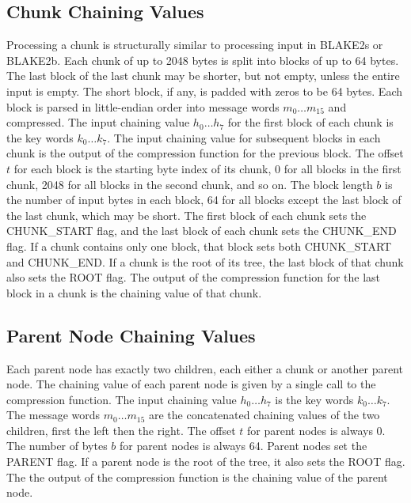\documentclass[11pt,notitlepage,a4paper]{article}
\begin{document}
\subsection{Chunk Chaining Values}\label{sec:chunk}

Processing a chunk is structurally similar to processing input in BLAKE2s or
BLAKE2b. Each chunk of up to 2048 bytes is split into blocks of up to 64 bytes.
The last block of the last chunk may be shorter, but not empty, unless the
entire input is empty. The short block, if any, is padded with zeros to be 64
bytes. Each block is parsed in little-endian order into message words $m_{0}
\ldots m_{15}$ and compressed. The input chaining value $h_{0} \ldots h_{7}$
for the first block of each chunk is the key words $k_{0} \ldots k_{7}$. The
input chaining value for subsequent blocks in each chunk is the output of the
compression function for the previous block. The offset $t$ for each block is
the starting byte index of its chunk, 0 for all blocks in the first chunk, 2048
for all blocks in the second chunk, and so on. The block length $b$ is the
number of input bytes in each block, 64 for all blocks except the last block of
the last chunk, which may be short. The first block of each chunk sets the
CHUNK\_START flag, and the last block of each chunk sets the CHUNK\_END flag.
If a chunk contains only one block, that block sets both CHUNK\_START and
CHUNK\_END. If a chunk is the root of its tree, the last block of that chunk
also sets the ROOT flag. The output of the compression function for the last
block in a chunk is the chaining value of that chunk.

\subsection{Parent Node Chaining Values}\label{sec:parent}

Each parent node has exactly two children, each either a chunk or another
parent node. The chaining value of each parent node is given by a single call
to the compression function. The input chaining value $h_{0} \ldots h_{7}$ is
the key words $k_{0} \ldots k_{7}$. The message words $m_{0} \ldots m_{15}$ are
the concatenated chaining values of the two children, first the left then the
right. The offset $t$ for parent nodes is always 0. The number of bytes $b$ for
parent nodes is always 64. Parent nodes set the PARENT flag. If a parent node
is the root of the tree, it also sets the ROOT flag. The the output of the
compression function is the chaining value of the parent node.
\end{document}
